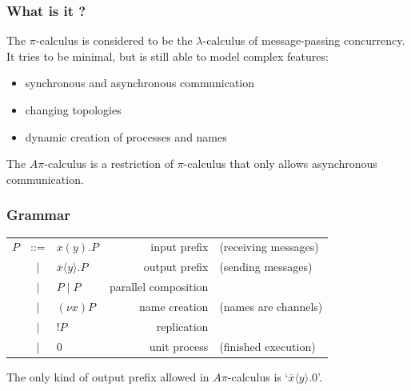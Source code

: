 \documentclass{beamer}
\begin{document}
\begin{frame}
\frametitle{What is it ?}
The $\pi$-calculus\cite{DBLP:journals/iandc/MilnerPW92a,DBLP:journals/iandc/MilnerPW92b} is considered to be the $\lambda$-calculus of message-passing concurrency.
It tries to be minimal, but is still able to model complex features:

\begin{itemize}
\item synchronous and asynchronous communication
\item changing topologies
\item dynamic creation of processes and names
\end{itemize}

\vspace{5pt}

The $A\pi$-calculus\cite{DBLP:conf/ecoop/HondaT91,Boudol92asynchronyand} is a restriction of $\pi$-calculus that only allows asynchronous communication.

\end{frame}

\begin{frame}
\frametitle{Grammar}

\begin{tabular}{lclrl}
$P$ & ::= & $x(y).P $                           & input prefix & (receiving messages)\\
    & $|$ & $\overline{x} \langle y \rangle.P $ & output prefix & (sending messages) \\
    & $|$ & $P\;|\;P $                          & parallel composition & \\
    & $|$ & $(\nu x)P $                         & name creation & (names are channels)\\
    & $|$ & $!P $                               & replication & \\
    & $|$ & $0 $                                & unit process & (finished execution)
\end{tabular}

\vspace{1cm}

The only kind of output prefix allowed in $A\pi$-calculus is `$\overline{x} \langle y \rangle.0 $'.

\end{frame}
\end{document}

